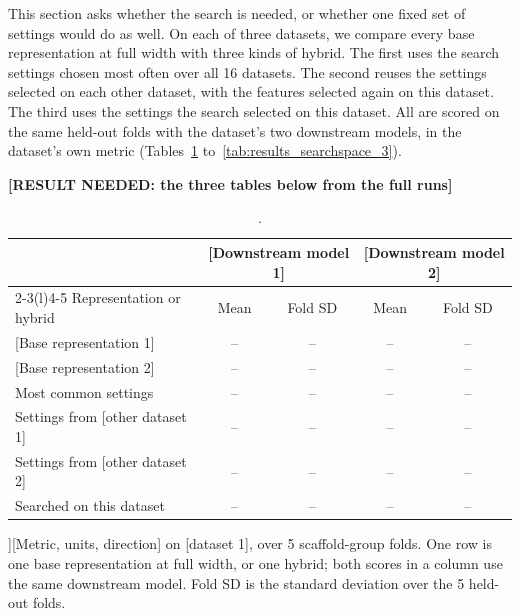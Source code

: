 This section asks whether the search is needed, or whether one fixed set of settings would do as well. On each of three datasets, we compare every base representation at full width with three kinds of hybrid. The first uses the search settings chosen most often over all 16 datasets. The second reuses the settings selected on each other dataset, with the features selected again on this dataset. The third uses the settings the search selected on this dataset. All are scored on the same held-out folds with the dataset's two downstream models, in the dataset's own metric (Tables~\ref{tab:results_searchspace_1} to~\ref{tab:results_searchspace_3}).

\textbf{[RESULT NEEDED: the three tables below from the full runs]}

\begin{table}[htbp]
\centering
\small
\begin{tabular}{@{}lcccc@{}}
\toprule
 & \multicolumn{2}{c}{[Downstream model 1]} & \multicolumn{2}{c}{[Downstream model 2]} \\
\cmidrule(lr){2-3}\cmidrule(l){4-5}
Representation or hybrid & Mean & Fold SD & Mean & Fold SD \\
\midrule
{[Base representation 1]} & -- & -- & -- & -- \\
{[Base representation 2]} & -- & -- & -- & -- \\
\addlinespace
Most common settings & -- & -- & -- & -- \\
Settings from [other dataset 1] & -- & -- & -- & -- \\
Settings from [other dataset 2] & -- & -- & -- & -- \\
\addlinespace
Searched on this dataset & -- & -- & -- & -- \\
\bottomrule
\end{tabular}
\caption[Search settings against base representations on [dataset 1].]{[Metric, units, direction] on [dataset 1], over 5 scaffold-group folds. One row is one base representation at full width, or one hybrid; both scores in a column use the same downstream model. Fold SD is the standard deviation over the 5 held-out folds.}
\label{tab:results_searchspace_1}
\end{table}

